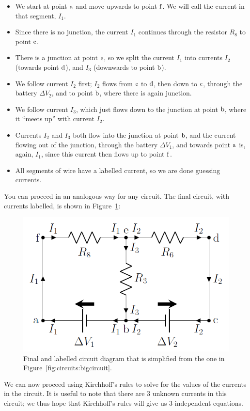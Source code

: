 \begin{itemize}
\item We start at point ${\rm a}$ and move upwards to point ${\rm f}$. We will call the current in that segment, $I_1$.
\item Since there is no junction, the current $I_1$ continues through the resistor $R_8$ to point ${\rm e}$.
\item There is a junction at point ${\rm e}$, so we split the current $I_1$ into currents $I_2$ (towards point ${\rm d}$), and $I_3$ (downwards to point ${\rm b}$).
\item We follow current $I_2$ first; $I_2$ flows from ${\rm e}$ to ${\rm d}$, then down to ${\rm c}$, through the battery $\Delta V_2$, and to point ${\rm b}$, where there is again junction.
\item We follow current $I_3$, which just flows down to the junction at point ${\rm b}$, where it ``meets up'' with current $I_2$.
\item Currents $I_2$ and $I_3$ both flow into the junction at point ${\rm b}$, and the current flowing out of the junction, through the battery $\Delta V_1$, and towards point ${\rm a}$ is, again, $I_1$, since this current then flows up to point ${\rm f}$.
\item All segments of wire have a labelled current, so we are done guessing currents.
\end{itemize}

You can proceed in an analogous way for any circuit. The final circuit, with currents labelled, is shown in Figure~\ref{fig:circuits:bigcircuit_simp}:

\begin{figure}[!htbp]
\centering
\includegraphics[width=0.45\linewidth]{files/bigcircuit_simp-74458b91bfc85d701204ec05fac2eb8a.png}
\caption[]{Final and labelled circuit diagram that is simplified from the one in Figure~\ref{fig:circuits:bigcircuit}.}
\label{fig:circuits:bigcircuit_simp}
\end{figure}

We can now proceed using Kirchhoff's rules to solve for the values of the currents in the circuit. It is useful to note that there are 3 unknown currents in this circuit; we thus hope that Kirchhoff's rules will give us 3 independent equations.

